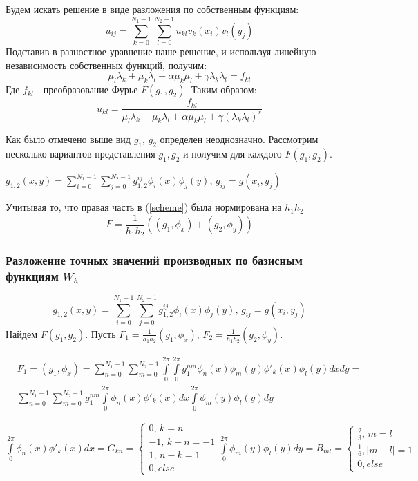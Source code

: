 \documentclass[oneside, final, 14pt]{article}
\begin{document}
Будем искать решение в виде разложения по собственным функциям:
$$u_{ij} = \sum \limits_{k=0}^{N_1 - 1} \sum \limits_{l=0}^{N_2 - 1} \overline{u}_{kl}v_k(x_i)v_l(y_j)$$
Подставив в разностное уравнение наше решение, и используя линейную независимость собственных функций, получим:
$$\mu_l \lambda_k + \mu_k \lambda_l + \alpha \mu_k \mu_l + \gamma \lambda_k \lambda_l = f_{kl}$$
Где $f_{kl}$ - преобразование Фурье $F(g_1,g_2)$.
Таким образом:
$$u_{kl} = \frac{f_{kl}}{\mu_l \lambda_k + \mu_k \lambda_l + \alpha \mu_k \mu_l + \gamma (\lambda_k \lambda_l)^s}$$

Как было отмечено выше вид $g_1,\,g_2$ определен неоднозначно. Рассмотрим несколько вариантов представления $g_1, g_2$ и получим для каждого $F(g_1,g_2)$.

$g_{1,2}(x,y) = \sum \limits_{i=0}^{N_1-1} \sum \limits_{j=0}^{N_2-1}g_{1,2}^{ij}\phi_i(x)\phi_j(y),\, g_{ij} = g(x_i,y_j)$

Учитывая то, что правая часть в (\ref{scheme}) была нормирована на $h_1h_2$
\begin{equation}\label{F}
F = \frac{1}{h_1h_2}((g_1,\phi_x) + (g_2,\phi_y))
\end{equation} 
\subsubsection{Разложение точных значений производных по базисным функциям $W_h$}
$$g_{1,2}(x,y) = \sum \limits_{i=0}^{N_1-1} \sum \limits_{j=0}^{N_2-1}g_{1,2}^{ij}\phi_i(x)\phi_j(y),\, g_{ij} = g(x_i,y_j)$$
Найдем $F(g_1,g_2)$. 
Пусть $F_1 = \frac{1}{h_1h_2}(g_1,\phi_x),\, F_2 = \frac{1}{h_1h_2}(g_2, \phi_y)$.

\begin{align*}
&F_1 = (g_1, \phi_x) = \sum \limits_{n = 0}^{N_1 - 1} \sum \limits_{m = 0}^{N_2 - 1} \int \limits_0^{2\pi}\int \limits_0^{2\pi} g_1^{nm}\phi_n(x)\phi_m(y) \phi'_k(x) \phi_l(y) dx dy =\\& 
\sum \limits_{n = 0}^{N_1 - 1} \sum \limits_{m = 0}^{N_2 - 1} g_1^{nm} \int \limits_0^{2\pi} \phi_n(x) \phi'_k(x) dx \int \limits_0^{2\pi} \phi_m(y) \phi_l(y) dy
\end{align*}

$\int \limits_0^{2\pi} \phi_n(x) \phi'_k(x) dx  = G_{kn} =
\begin{cases} 
    0, \, k = n \\ 
    -1, \, k - n = -1 \\
    1, \, n - k = 1 \\
    0, else
\end{cases}
\int \limits_0^{2\pi} \phi_m(y) \phi_l(y) dy = B_{ml} =
\begin{cases}
    \frac{2}{3}, \, m = l \\
    \frac{1}{6}, \mid m-l \mid = 1\\
    0, else
\end{cases}$
\end{document}
